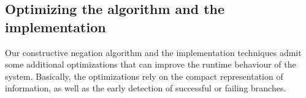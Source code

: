 \documentclass{tlp}
\begin{document}



\vspace{-0.1in}

\subsection{Optimizing the algorithm and the implementation}
\label{optimization}

Our constructive negation algorithm and the implementation techniques
admit some additional optimizations that can improve the runtime
behaviour of the system. Basically, the optimizations rely on the
compact representation of information, as well as the early detection
of successful or failing branches.
\end{document}
